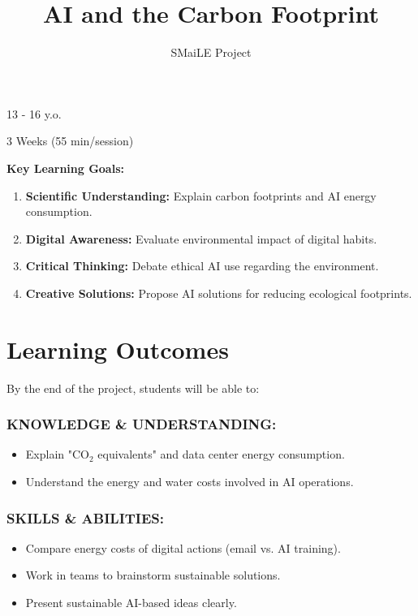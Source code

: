 \documentclass[11pt, a4paper]{article}
\begin{document}
\title{\textbf{\color{SmaileGreen}AI and the Carbon Footprint}}
\author{SMaiLE Project}
\date{}
\maketitle
\thispagestyle{plain}

\begin{keyinfobox}
    \begin{description}[leftmargin=*, labelindent=0pt]
        \item[\bfseries\color{SmaileGreen} Target Group:] 13 - 16 y.o.
        \item[\bfseries\color{SmaileGreen} Duration:] 3 Weeks (55 min/session)
    \end{description}
    \textbf{Key Learning Goals:}
    \begin{enumerate}
        \item \textbf{Scientific Understanding:} Explain carbon footprints and AI energy consumption.
        \item \textbf{Digital Awareness:} Evaluate environmental impact of digital habits.
        \item \textbf{Critical Thinking:} Debate ethical AI use regarding the environment.
        \item \textbf{Creative Solutions:} Propose AI solutions for reducing ecological footprints.
    \end{enumerate}
\end{keyinfobox}

\section*{Learning Outcomes}
By the end of the project, students will be able to:

\subsubsection*{KNOWLEDGE \& UNDERSTANDING:}
\begin{itemize}
    \item Explain "CO$_2$ equivalents" and data center energy consumption.
    \item Understand the energy and water costs involved in AI operations.
\end{itemize}

\subsubsection*{SKILLS \& ABILITIES:}
\begin{itemize}
    \item Compare energy costs of digital actions (email vs. AI training).
    \item Work in teams to brainstorm sustainable solutions.
    \item Present sustainable AI-based ideas clearly.
\end{itemize}
\end{document}
